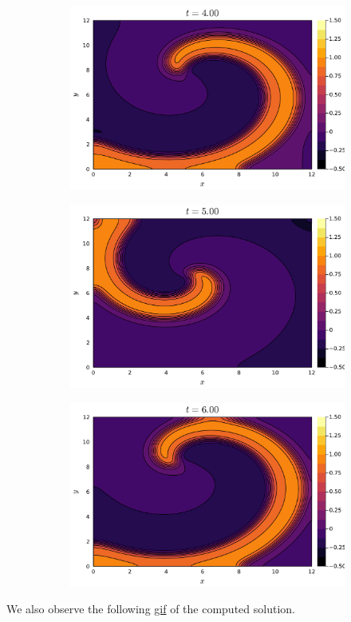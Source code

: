 \documentclass{article}
\begin{document}
\begin{figure}[H]
\begin{subfigure}{0.3\linewidth}
	\end{subfigure}
	\begin{subfigure}{0.3\linewidth}
		\centering
		\includegraphics[width=\linewidth]{prob6_t=4.pdf}
	\end{subfigure}
	\begin{subfigure}{0.3\linewidth}
		\centering
		\includegraphics[width=\linewidth]{prob6_t=5.pdf}
	\end{subfigure}
	\begin{subfigure}{0.3\linewidth}
		\centering
		\includegraphics[width=\linewidth]{prob6_t=6.pdf}
	\end{subfigure}
\end{figure}
We also observe the following \href{https://imgur.com/a/skyuaXg}{gif} of the computed solution.
\end{document}
